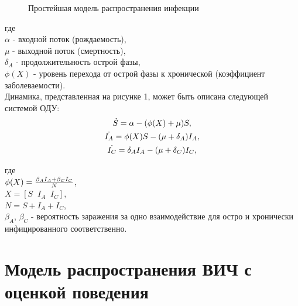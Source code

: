 \documentclass[a4paper]{report}
\begin{document}
\begin{figure}[htb]
		
		\caption{Простейшая модель распространения инфекции} 
		
		\label{fig:dynamics}
		
	\end{figure}
	
	где \\
	$\alpha$ - входной поток (рождаемость), \\
	$\mu$ - выходной поток (смертность), \\
	$\delta_A$ - продолжительность острой фазы, \\
	$\phi(X)$ - уровень перехода от острой фазы к хронической (коэффициент заболеваемости).\\
	
	
	Динамика, представленная на рисунке 1, может быть описана следующей системой ОДУ:
	\begin{gather}
	\dot{S} = \alpha - (\phi(X) + \mu)S, \notag \\	
	\dot{I_{A}} = \phi(X)S - (\mu + \delta_A)I_{A}, \label{simple} \\
	\dot{I_{C}} = \delta_A I_{A} - (\mu + \delta_C)I_{C},\notag
	\end{gather}
	
	где \\
	$\phi(X) = {{\beta_A I_A + \beta_C I_C}\over{N}}$, \\
	$X \! = \! \left[S\;\;I_{A}\;\;I_{C}\right]$, \\
	$N = S + I_A + I_C$, \\
	$\beta_A$, $\beta_C$ - вероятность заражения за одно взаимодействие для остро и хронически инфицированного соответственно.
	
	\newpage
	\section{Модель распространения ВИЧ с оценкой поведения}
	
\end{document}
